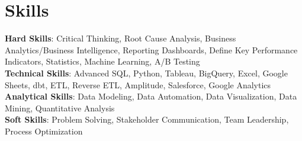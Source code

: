 \section{Skills}
  \begin{itemize}[leftmargin=0.1in, label={}]
    \normalsize{\item{
      \textbf{Hard Skills}: Critical Thinking, Root Cause Analysis, Business Analytics/Business Intelligence, Reporting Dashboards, Define Key Performance Indicators, Statistics, Machine Learning, A/B Testing \\
      \textbf{Technical Skills}: Advanced SQL, Python, Tableau, BigQuery, Excel, Google Sheets, dbt, ETL, Reverse ETL, Amplitude, Salesforce, Google Analytics \\
      \textbf{Analytical Skills}: Data Modeling, Data Automation, Data Visualization, Data Mining, Quantitative Analysis \\
      \textbf{Soft Skills}: Problem Solving, Stakeholder Communication, Team Leadership, Process Optimization \\
     }}
  \end{itemize}
